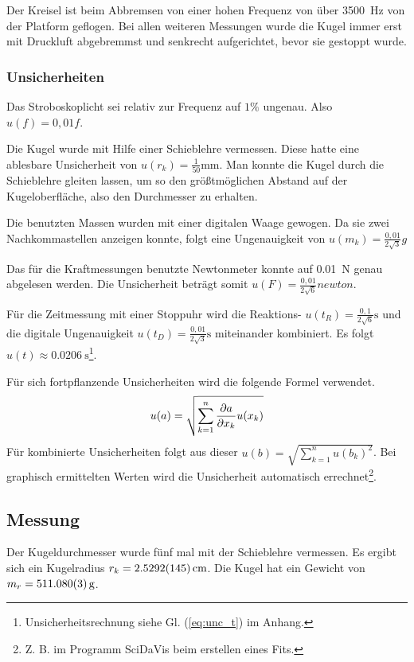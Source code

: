 	Der Kreisel ist beim Abbremsen von einer hohen Frequenz von über \SI{3500}{\hertz} von der Platform geflogen.
	Bei allen weiteren Messungen wurde die Kugel immer erst mit Druckluft abgebremmst und senkrecht aufgerichtet, bevor sie gestoppt wurde.
	
	\subsubsection{Unsicherheiten}
	
	Das Stroboskoplicht sei relativ zur Frequenz auf $1\%$ ungenau.
	Also $u(f) = 0,01 f$.
	
	Die Kugel wurde mit Hilfe einer Schieblehre vermessen.
	Diese hatte eine ablesbare Unsicherheit von $u(r_k) =\frac{1}{50}\si{\milli\meter}$.
	Man konnte die Kugel durch die Schieblehre gleiten lassen, um so den größtmöglichen Abstand auf der Kugeloberfläche, also den Durchmesser zu erhalten.
	
	Die benutzten Massen wurden mit einer digitalen Waage gewogen.
	Da sie zwei Nachkommastellen anzeigen konnte, folgt eine Ungenauigkeit von $u(m_k) = \frac{0,01}{2\sqrt{3}}\si{g}$
	
	Das für die Kraftmessungen benutzte Newtonmeter konnte auf \SI{0,01}{\newton} genau abgelesen werden.
	Die Unsicherheit beträgt somit $u(F) = \frac{0,01}{2\sqrt{6}} \si{newton}$.
	
	Für die Zeitmessung mit einer Stoppuhr wird die Reaktions- $u(t_R) = \frac{0,1}{2\sqrt6}\si{\second}$ und die digitale Ungenauigkeit $u(t_D) = \frac{0,01}{2\sqrt3}\si{\second}$ miteinander kombiniert.
	Es folgt $u(t) \approx \SI{0,0206}{\second}$\footnote{Unsicherheitsrechnung siehe Gl. (\ref{eq:unc_t}) im Anhang.}.
	
	Für sich fortpflanzende Unsicherheiten wird die folgende Formel verwendet.
	\begin{equation}
		\label{eq:unc_combined}
		u(a) = \sqrt{\sum_{k=1}^{n} \pdv{a}{x_k} u(x_k)}
	\end{equation}
	Für kombinierte Unsicherheiten folgt aus dieser $u(b) = \sqrt{\sum_{k=1}^n u(b_k)^2}$.
	Bei graphisch ermittelten Werten wird die Unsicherheit automatisch errechnet\footnote{Z. B. im Programm SciDaVis beim erstellen eines Fits.}.

\subsection{Messung}
	
	Der Kugeldurchmesser wurde fünf mal mit der Schieblehre vermessen.
	Es ergibt sich ein Kugelradius $r_k = \SI{2,5292 +- 0,0145}{\centi\meter}$.
	Die Kugel hat ein Gewicht von $m_r = \SI{511,08 +- 0,003}{g}$.
	

